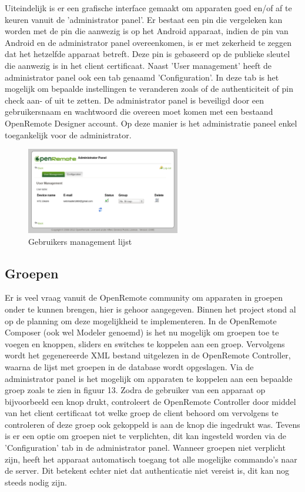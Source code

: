 \documentclass[]{article}
\begin{document}
Uiteindelijk is er een grafische interface gemaakt om apparaten goed en/of af te
keuren vanuit de 'administrator panel'. Er bestaat een pin die vergeleken kan
worden met de pin die aanwezig is op het Android apparaat, indien de pin van
Android en de administrator panel overeenkomen, is er met zekerheid te zeggen
dat het hetzelfde apparaat betreft. Deze pin is gebaseerd op de publieke
sleutel die aanwezig is in het client certificaat. Naast 'User management' heeft de
administrator panel ook een tab genaamd 'Configuration'. In deze tab is het
mogelijk om bepaalde instellingen te veranderen zoals of de authenticiteit of
pin check aan- of uit te zetten.  De administrator panel is beveiligd door een
gebruikersnaam en wachtwoord die overeen moet komen met een bestaand OpenRemote
Designer account. Op deze manier is het administratie paneel enkel toegankelijk
voor de administrator.

\begin{figure}[htpb]
   \begin{center}
     \includegraphics[width=0.6\textwidth]{userlist.pdf}
   \end{center}
   \label{userlist}
   \caption{Gebruikers management lijst}
\end{figure}

\subsection{Groepen}
Er is veel vraag vanuit de OpenRemote community om apparaten in groepen onder te
kunnen brengen, hier is gehoor aangegeven. Binnen het project stond al op de
planning om deze mogelijkheid te implementeren. In de OpenRemote Composer (ook
wel Modeler genoemd) is het nu mogelijk om groepen toe te voegen en knoppen,
sliders en switches te koppelen aan een groep. Vervolgens wordt het gegenereerde
XML bestand uitgelezen in de OpenRemote Controller, waarna de lijst met groepen
in de database wordt opgeslagen. Via de administrator panel is het mogelijk om
apparaten te koppelen aan een bepaalde groep zoals te zien in figuur 13. Zodra
de gebruiker van een apparaat op bijvoorbeeld een knop drukt, controleert de
OpenRemote Controller door middel van het client certificaat tot welke groep de
client behoord om vervolgens te controleren of deze groep ook gekoppeld is aan
de knop die ingedrukt was. Tevens is er een optie om groepen niet te
verplichten, dit kan ingesteld worden via de 'Configuration' tab in de
administrator panel. Wanneer groepen niet verplicht zijn, heeft het apparaat
automatisch toegang tot alle mogelijke commando's naar de server. Dit betekent
echter niet dat authenticatie niet vereist is, dit kan nog steeds nodig zijn.
\end{document}
